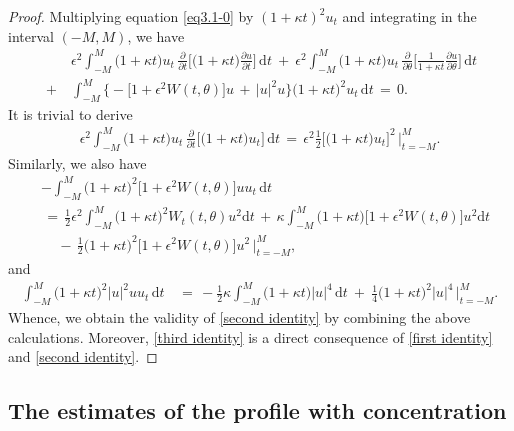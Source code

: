 \documentclass[10pt, reqno]{amsart}
\numberwithin{equation}{section}
\theoremstyle{definition}
\begin{document}
{{\begin{proof}
\medskip
{}
 Multiplying equation \eqref{eq3.1-0} by $(1+\kappa t)^2 u_t$ and integrating in the interval $(-M, M)$, we have
\begin{align*}
 & \epsilon^2\int_{-M}^{M} \big(1+\kappa t\big)u_t\,
 \frac{\partial}{\partial t} \Big[ \big(1+\kappa t\big) \frac{\partial u}{\partial t} \Big]\,{\mathrm d}t
 \ +\
 \epsilon^2\int_{-M}^{M} \big(1+\kappa t\big)u_t\,
 \frac{\partial}{\partial\theta} \Big[ \frac{1}{1+\kappa t} \frac{\partial u}{\partial\theta} \Big]
 \,{\mathrm d}t
\nonumber\\[2mm]
 \ +\ &\int_{-M}^{M}\Big\{ -\big[1+ \epsilon^2 W(t, \theta)\big] u \,+\, |u|^2 u \Big\}
 \big(1+\kappa t\big)^2 u_t \,{\mathrm d}t
 \,=\,0.
\end{align*}
 It is trivial to derive
\begin{align*}
 \epsilon^2\int_{-M}^{M} \big(1+\kappa t\big) u_t \, \frac{\partial}{\partial t}
 \Big[ \big(1+\kappa t\big) u_t\Big]\,{\mathrm d}t
 \,=\,
 \epsilon^2\frac{1}{2}\Big[ \big(1+\kappa t\big) u_t\Big]^2\, \Bigg|_{t=-M}^{M}.
\end{align*}
 Similarly, we also have
\begin{align*}
 &-\int_{-M}^{M} \big(1+\kappa t\big)^2 \big[1+ \epsilon^2 W(t, \theta)\big] u u_t \,{\mathrm d}t
\nonumber\\[2mm]
 &\,=\,
 \frac{1}{2} \epsilon^2 \int_{-M}^{M} \big(1+\kappa t\big)^2 W_t(t, \theta) u^2 {\mathrm d}t
 \,+\,
 \kappa \int_{-M}^{M} \big(1+\kappa t\big) \big[1+ \epsilon^2 W(t, \theta)\big] u^2 {\mathrm d}t
\nonumber\\[2mm]
 &\quad\,-\, \frac{1}{2}\big(1+\kappa t\big)^2 \big[1+ \epsilon^2 W(t, \theta)\big] u^2\, \Bigg|_{t=-M}^{M},
\end{align*}
 and
\begin{align*}
 \int_{-M}^{M} \big(1+ \kappa t\big)^2 |u|^2 u u_t \,{\mathrm d}t
 &\,=\,
 -\frac{1}{2} \kappa \int_{-M}^{M} \big(1+\kappa t\big) |u|^4\,{\mathrm d}t
 \ +\
 \frac 1 4 \big(1+\kappa t\big)^2 |u|^4\, \Bigg|_{t=-M}^{M}.
\end{align*}
Whence, we obtain the validity of \eqref{second identity} by combining the above calculations.
Moreover, \eqref{third identity} is a direct consequence of \eqref{first identity} and \eqref{second identity}.
\end{proof}





\medskip
\subsection{ The estimates of the profile with concentration}\label{Section4.2}\

}}
\end{document}
